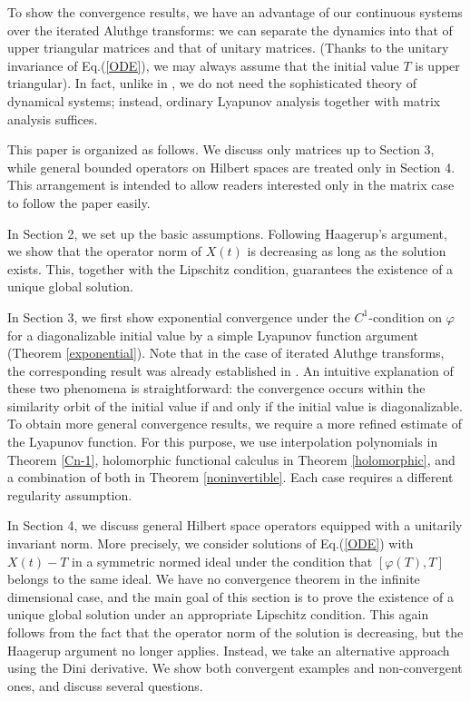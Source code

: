 \documentclass[12pt]{article}
\theoremstyle{definition}
\numberwithin{equation}{section}
\begin{document}
To show the convergence results, we have an advantage of our continuous systems over 
the iterated Aluthge transforms: we can separate the dynamics into that of 
upper triangular matrices and that of unitary matrices.  
(Thanks to the unitary invariance of Eq.(\ref{ODE}), we may always assume that the initial value 
$T$ is upper triangular). 
In fact, unlike in \cite{APS2007}, we do not need the sophisticated theory of dynamical systems; 
instead, ordinary Lyapunov analysis together with matrix analysis suffices.   
 

This paper is organized as follows. 
We discuss only matrices up to Section 3, while general bounded operators on Hilbert spaces are treated  
only in Section 4. 
This arrangement is intended to allow readers interested only in the matrix case to follow the paper easily. 

In Section 2, we set up the basic assumptions.  
Following Haagerup's argument, we show that the operator norm of $X(t)$ is decreasing as long as 
the solution exists. 
This, together with the Lipschitz condition, guarantees the existence of a unique global solution. 

In Section 3, we first show exponential convergence under the $C^1$-condition on $\varphi$ for a diagonalizable initial value  
by a simple Lyapunov function argument (Theorem \ref{exponential}).  
Note that in the case of iterated Aluthge transforms, the corresponding result was already established in \cite{APS2007}. 
An intuitive explanation of these two phenomena is straightforward: 
the convergence occurs within the similarity orbit of the initial value if and only if the initial value is diagonalizable. 
To obtain more general convergence results, we require a more refined estimate of the Lyapunov function. 
For this purpose, we use interpolation polynomials in Theorem \ref{Cn-1}, holomorphic functional calculus 
in Theorem \ref{holomorphic}, and a combination of both in Theorem \ref{noninvertible}.  
Each case requires a different regularity assumption.

In Section 4, we discuss general Hilbert space operators equipped with a unitarily invariant norm.  
More precisely, we consider solutions of Eq.(\ref{ODE}) with $X(t)-T$ in a symmetric normed ideal 
under the condition that $[\varphi(T),T]$ belongs to the same ideal. 
We have no convergence theorem in the infinite dimensional case, and the main goal of this section is to prove  
the existence of a unique global solution under an appropriate Lipschitz condition.  
This again follows from the fact that the operator norm of the solution is decreasing, but the Haagerup argument 
no longer applies. 
Instead, we take an alternative approach using the Dini derivative. 
We show both convergent examples and non-convergent ones, and discuss several questions.  
\end{document}
